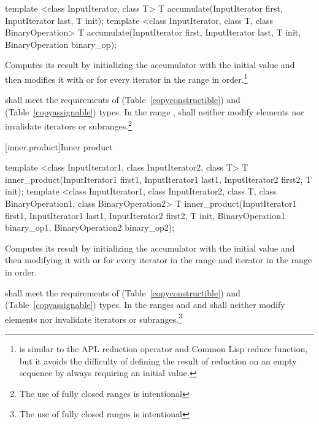 %
\begin{itemdecl}
template <class InputIterator, class T>
  T accumulate(InputIterator first, InputIterator last, T init);
template <class InputIterator, class T, class BinaryOperation>
  T accumulate(InputIterator first, InputIterator last, T init,
               BinaryOperation binary_op);
\end{itemdecl}

\begin{itemdescr}
\pnum
\effects
Computes its result by initializing the accumulator
with the initial value
and then modifies it with
or
for every iterator
in the range 
in order.\footnote{
is similar to the APL reduction operator and Common Lisp reduce function, but
it avoids the difficulty of defining the result of reduction on an empty
sequence by always requiring an initial value.}

\pnum
\requires
{} shall meet the requirements of  (Table~\ref{copyconstructible})
and  (Table~\ref{copyassignable}) types.
In the range
,
shall neither modify elements nor invalidate iterators or subranges.\footnote{The use of fully closed ranges is intentional
}
\end{itemdescr}

[inner.product]{Inner product}
%

%
\begin{itemdecl}
template <class InputIterator1, class InputIterator2, class T>
  T inner_product(InputIterator1 first1, InputIterator1 last1,
                  InputIterator2 first2, T init);
template <class InputIterator1, class InputIterator2, class T,
    class BinaryOperation1, class BinaryOperation2>
  T inner_product(InputIterator1 first1, InputIterator1 last1,
                  InputIterator2 first2, T init,
                  BinaryOperation1 binary_op1,
                  BinaryOperation2 binary_op2);
\end{itemdecl}

\begin{itemdescr}
\pnum
\effects
Computes its result by initializing the accumulator
with the initial value
and then modifying it with
or
for every iterator
in the range 
and iterator
in the range
in order.

\pnum
\requires
{} shall meet the requirements of  (Table~\ref{copyconstructible})
and  (Table~\ref{copyassignable}) types.
In the ranges
and
and
shall neither modify elements nor invalidate iterators or subranges.\footnote{The use of fully closed ranges is intentional
}
\end{itemdescr}


